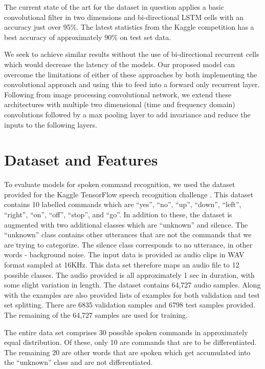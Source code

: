 \documentclass{article}
\begin{document}
The current state of the art for the dataset in question applies a
basic convolutional filter in two dimensions and bi-directional LSTM
cells with an accuracy just over 95\%\cite{zhang2017hello}. The latest
statistics from the
Kaggle competition has a best accuracy of approximately
90\%\cite{kaggle} on test set data.

We seek to achieve similar results without the use
of bi-directional recurrent cells which would decrease the latency of
the models. Our proposed model can overcome the limitations of either
of these approaches by
both implementing the convolutional approach and using this to feed
into a forward only recurrent layer. Following from image processing
convolutional network, we extend these architectures with multiple two
dimensional (time and frequency domain) convolutions followed by a max
pooling layer to add invariance and reduce the inputs to the following
layers.

\section{Dataset and Features}
To evaluate models for spoken command recognition, we used the dataset
provided for the Kaggle TensorFlow speech recognition challenge
\cite{kaggle, speechcommands}. This dataset contains 10 labelled
commands which are ``yes'', ``no'', ``up'', ``down'', ``left'',
``right'', ``on'', ``off'', ``stop'', and ``go''. In addition to
these, the dataset is augmented with two additional classes which are
“unknown” and silence. The “unknown” class contains other utterances
that are not the commands that we are
trying to categorize. The silence class corresponds to no
utterance, in other words - background noise. The input data is provided as
audio clips in WAV format sampled at 16KHz. This data set therefore
maps an audio file to 12 possible classes. The audio provided is all
approximately 1 sec in duration, with some slight variation in
length. The dataset contains 64,727 audio samples. Along with the examples
are also provided lists of examples for both validation and test set
splitting. There are 6835 validation samples and 6798 test samples
provided. The remaining of the 64,727 samples are used for training.

The entire data set comprises 30 possible spoken commands in
approximately equal distribution. Of these, only 10 are commands that
are to be differentiated. The remaining 20 are other words that are
spoken which get accumulated into the ``unknown'' class and are not
differentiated.
\end{document}
